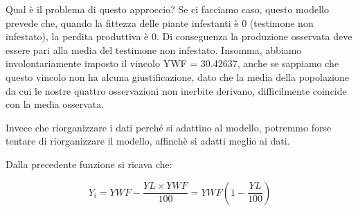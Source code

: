 \documentclass[a4paper,12pt,oneside]{book}
\newenvironment{Shaded}{}{}
\newcommand{\KeywordTok}[1]{#1}
\newcommand{\DataTypeTok}[1]{#1}
\newcommand{\DecValTok}[1]{#1}
\newcommand{\FloatTok}[1]{#1}
\newcommand{\StringTok}[1]{#1}
\newcommand{\CommentTok}[1]{#1}
\newcommand{\OperatorTok}[1]{#1}
\newcommand{\NormalTok}[1]{#1}
\begin{document}
\begin{Shaded}
\end{Shaded}

Qual è il problema di questo approccio? Se ci facciamo caso, questo modello prevede che, quando la fittezza delle piante infestanti è 0 (testimone non infestato), la perdita produttiva è 0. Di conseguenza la produzione osservata deve essere pari alla media del testimone non infestato. Insomma, abbiamo involontariamente imposto il vincolo YWF = 30.42637, anche se sappiamo che questo vincolo non ha alcuna giustificazione, dato che la media della popolazione da cui le nostre quattro osservazioni non inerbite derivano, difficilmente coincide con la media osservata.

Invece che riorganizzare i dati perché si adattino al modello, potremmo forse tentare di riorganizzare il modello, affinchè si adatti meglio ai dati.

Dalla precedente funzione si ricava che:

\[Y_i = YWF - \frac{YL \times YWF}{100} = YWF\left( {1 - \frac{YL}{100}} \right)\]
\end{document}
